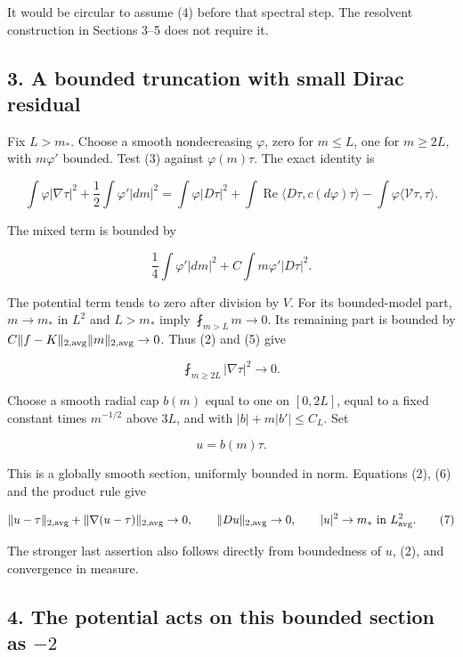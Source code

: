 \documentclass[11pt]{article}
\begin{document}
It would be circular to assume (4) before that spectral step. The
resolvent construction in Sections 3--5 does not require it.

\hypertarget{o10strength:a-bounded-truncation-with-small-dirac-residual}{%
\subsection{3. A bounded truncation with small Dirac
residual}\label{o10strength:a-bounded-truncation-with-small-dirac-residual}}

Fix \(L>m_*\). Choose a smooth nondecreasing \(\varphi\), zero for
\(m\le L\), one for \(m\ge2L\), with \(m\varphi'\) bounded. Test (3)
against \(\varphi(m)\tau\). The exact identity is

\[
 \int\varphi|\nabla\tau|^2+
 \frac12\int\varphi'|dm|^2
 =\int\varphi|D\tau|^2+
 \int\operatorname{Re}\langle D\tau,c(d\varphi)\tau\rangle
 -\int\varphi\langle\mathcal V\tau,\tau\rangle.
\tag{5}
\]

The mixed term is bounded by

\[
 \frac14\int\varphi'|dm|^2+
 C\int m\varphi'|D\tau|^2.
\]

The potential term tends to zero after division by \(V\). For its
bounded-model part, \(m\to m_*\) in \(L^2\) and \(L>m_*\) imply
\(\fint_{m>L}m\to0\). Its remaining part is bounded by
\(C\|f-K\|_{2,\rm avg}\|m\|_{2,\rm avg}\to0\). Thus (2) and (5) give

\[
 \fint_{m\ge2L}|\nabla\tau|^2\longrightarrow0.
\tag{6}
\]

Choose a smooth radial cap \(b(m)\) equal to one on \([0,2L]\), equal to
a fixed constant times \(m^{-1/2}\) above \(3L\), and with
\(|b|+m|b'|\le C_L\). Set

\[
 u=b(m)\tau.
\]

This is a globally smooth section, uniformly bounded in norm. Equations
(2), (6) and the product rule give

\[
 \|u-\tau\|_{2,\rm avg}+\|\nabla(u-\tau)\|_{2,\rm avg}\to0,
 \qquad \|Du\|_{2,\rm avg}\to0,
 \qquad |u|^2\to m_*\text{ in }L^2_{\rm avg}.
\tag{7}
\]

The stronger last assertion also follows directly from boundedness of
\(u\), (2), and convergence in measure.

\hypertarget{o10strength:the-potential-acts-on-this-bounded-section-as--2}{%
\subsection{\texorpdfstring{4. The potential acts on this bounded
section as
\(-2\)}{4. The potential acts on this bounded section as -2}}\label{o10strength:the-potential-acts-on-this-bounded-section-as--2}}
\end{document}
